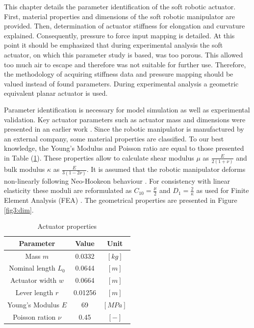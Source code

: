 \label{chap3}

This chapter details the parameter identification of the soft robotic actuator. First, material properties and dimensions of the soft robotic manipulator are provided. Then, determination of actuator stiffness for elongation and curvature explained. Consequently, pressure to force input mapping is detailed. At this point it should be emphasized that during experimental analysis the soft actuator, on which this parameter study is based, was too porous. This allowed too much air to escape and therefore was not suitable for further use. Therefore, the methodology of acquiring stiffness data and pressure mapping should be valued instead of found parameters. During experimental analysis a geometric equivalent planar actuator is used. 


Parameter identification is necessary for model simulation as well as experimental validation. Key actuator parameters such as actuator mass and dimensions were presented in an earlier work \cite{berkers}. Since the robotic manipulator is manufactured by an external company, some material properties are classified. To our best knowledge, the Young's Modulus and Poisson ratio are equal to those presented in Table (\ref{tab4:parameters}). These properties allow to calculate shear modulus $\mu$ as $\frac{E}{2(1+\nu)}$ and bulk modulus $\kappa$ as $\frac{E}{3(1-2\nu)}$. It is assumed that the robotic manipulator deforms non-linearly following Neo-Hookeon behaviour \cite{Caasenbrood2020StiffnessModel}. For consistency with linear elasticity these moduli are reformulated as $C_{10} = \frac{\mu}{2}$ and $D_{1} = \frac{2}{\kappa}$ as used for Finite Element Analysis (FEA) \cite{neohookean}. The geometrical properties are presented in Figure \ref{fig3:dim}.


\begin{table}[H]
    \centering
    \caption{Actuator properties}
    \begin{tabular}{|c|c|c|} \hline
      \textbf{Parameter}   &  \textbf{Value} & \textbf{Unit} \\ \hline
      Mass $m$             &    0.0332       & $[kg]$ \\ 
      Nominal length $L_0$ &    0.0644       & $[m]$  \\ 
      Actuator width  $w$     &    0.0664       & $[m]$  \\
      Lever length $r$     &    0.01256      & $[m]$  \\ 
      Young's Modulus $E$  &    69           & $[MPa]$\\ 
      Poisson ration $\nu$ &    0.45         & $[-]$ \\ \hline
    \end{tabular}
    \label{tab4:parameters}
\end{table}

